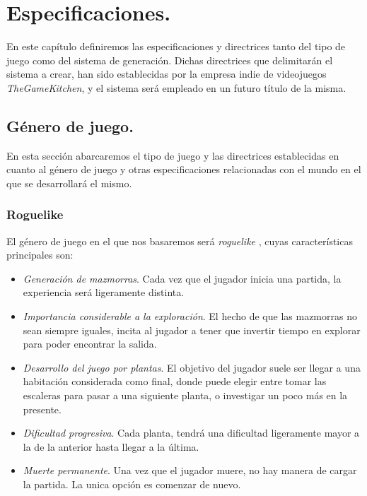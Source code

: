 \chapter{Especificaciones.}\label{cap:capitulo2}

En este capítulo definiremos las especificaciones y directrices tanto del tipo de juego como del sistema de generación. Dichas directrices que delimitarán el sistema a crear, han sido establecidas por la empresa indie de videojuegos \emph{TheGameKitchen}, y el sistema será empleado en un futuro título de la misma.

\section{Género de juego.}

En esta sección abarcaremos el tipo de juego y las directrices establecidas en cuanto al género de juego y otras especificaciones relacionadas con el mundo en el que se desarrollará el mismo.

\subsection{Roguelike}

El género de juego en el que nos basaremos será \emph{roguelike} \cite{rlike}, cuyas características principales son:

\begin{itemize}
	\item \emph{Generación de mazmorras}. Cada vez que el jugador inicia una partida, la experiencia será ligeramente distinta.
	\item \emph{Importancia considerable a la exploración}. El hecho de que las mazmorras no sean siempre iguales, incita al jugador a tener que invertir tiempo en explorar para poder encontrar la salida.
	\item \emph{Desarrollo del juego por plantas}. El objetivo del jugador suele ser llegar a una habitación considerada como final, donde puede elegir entre tomar las escaleras para pasar a una siguiente planta, o investigar un poco más en la presente.
	\item \emph{Dificultad progresiva}. Cada planta, tendrá una dificultad ligeramente mayor a la de la anterior hasta llegar a la última.
	\item \emph{Muerte permanente}. Una vez que el jugador muere, no hay manera de cargar la partida. La unica opción es comenzar de nuevo.
\end{itemize}


